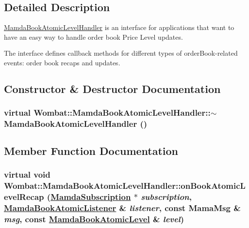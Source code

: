 \subsection{Detailed Description}
\hyperlink{classWombat_1_1MamdaBookAtomicLevelHandler}{Mamda\-Book\-Atomic\-Level\-Handler} is an interface for applications that want to have an easy way to handle order book Price Level updates. 

The interface defines callback methods for different types of order\-Book-related events: order book recaps and updates. 



\subsection{Constructor \& Destructor Documentation}
\hypertarget{classWombat_1_1MamdaBookAtomicLevelHandler_462755635d681d8330b3db084532b9c7}{
\subsubsection[$\sim$MamdaBookAtomicLevelHandler]{\setlength{\rightskip}{0pt plus 5cm}virtual Wombat::Mamda\-Book\-Atomic\-Level\-Handler::$\sim$Mamda\-Book\-Atomic\-Level\-Handler ()}}
\label{classWombat_1_1MamdaBookAtomicLevelHandler_462755635d681d8330b3db084532b9c7}




\subsection{Member Function Documentation}
\hypertarget{classWombat_1_1MamdaBookAtomicLevelHandler_6963551b1b7a9db1b1a61168a9fdd224}{
\subsubsection[onBookAtomicLevelRecap]{\setlength{\rightskip}{0pt plus 5cm}virtual void Wombat::Mamda\-Book\-Atomic\-Level\-Handler::on\-Book\-Atomic\-Level\-Recap (\hyperlink{classWombat_1_1MamdaSubscription}{Mamda\-Subscription} $\ast$ {\em subscription}, \hyperlink{classWombat_1_1MamdaBookAtomicListener}{Mamda\-Book\-Atomic\-Listener} \& {\em listener}, const Mama\-Msg \& {\em msg}, const \hyperlink{classWombat_1_1MamdaBookAtomicLevel}{Mamda\-Book\-Atomic\-Level} \& {\em level})}}
\label{classWombat_1_1MamdaBookAtomicLevelHandler_6963551b1b7a9db1b1a61168a9fdd224}


